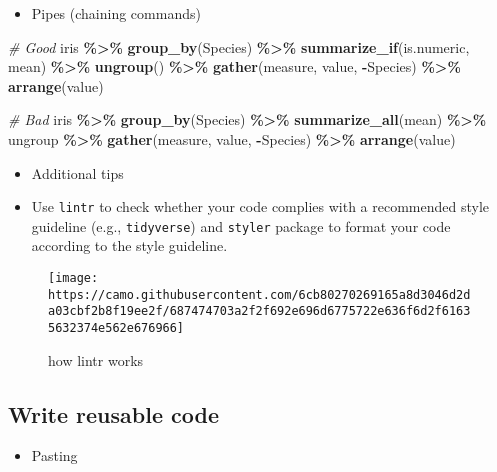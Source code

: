 \documentclass[
]{book}
\newenvironment{Shaded}{\begin{snugshade}}{\end{snugshade}}
\newcommand{\CommentTok}[1]{\textcolor[rgb]{0.56,0.35,0.01}{\textit{#1}}}
\newcommand{\KeywordTok}[1]{\textcolor[rgb]{0.13,0.29,0.53}{\textbf{#1}}}
\newcommand{\NormalTok}[1]{#1}
\newcommand{\OperatorTok}[1]{\textcolor[rgb]{0.81,0.36,0.00}{\textbf{#1}}}
\newcommand{\StringTok}[1]{\textcolor[rgb]{0.31,0.60,0.02}{#1}}
\providecommand{\tightlist}{%
  \setlength{\itemsep}{0pt}\setlength{\parskip}{0pt}}
\begin{document}
\begin{itemize}
\tightlist
\item
  Pipes (chaining commands)
\end{itemize}

\begin{Shaded}
\begin{Highlighting}[]
\CommentTok{\# Good}
\NormalTok{iris }\OperatorTok{\%>\%}
\StringTok{  }\KeywordTok{group\_by}\NormalTok{(Species) }\OperatorTok{\%>\%}
\StringTok{  }\KeywordTok{summarize\_if}\NormalTok{(is.numeric, mean) }\OperatorTok{\%>\%}
\StringTok{  }\KeywordTok{ungroup}\NormalTok{() }\OperatorTok{\%>\%}
\StringTok{  }\KeywordTok{gather}\NormalTok{(measure, value, }\OperatorTok{{-}}\NormalTok{Species) }\OperatorTok{\%>\%}
\StringTok{  }\KeywordTok{arrange}\NormalTok{(value)}

\CommentTok{\# Bad}
\NormalTok{iris }\OperatorTok{\%>\%}\StringTok{ }\KeywordTok{group\_by}\NormalTok{(Species) }\OperatorTok{\%>\%}\StringTok{ }\KeywordTok{summarize\_all}\NormalTok{(mean) }\OperatorTok{\%>\%}
\NormalTok{ungroup }\OperatorTok{\%>\%}\StringTok{ }\KeywordTok{gather}\NormalTok{(measure, value, }\OperatorTok{{-}}\NormalTok{Species) }\OperatorTok{\%>\%}
\KeywordTok{arrange}\NormalTok{(value)}
\end{Highlighting}
\end{Shaded}

\begin{itemize}
\item
  Additional tips
\item
  Use \texttt{lintr} to check whether your code complies with a recommended style guideline (e.g., \texttt{tidyverse}) and \texttt{styler} package to format your code according to the style guideline.
\end{itemize}

\begin{figure}
\centering
\texttt{[image: https://camo.githubusercontent.com/6cb80270269165a8d3046d2da03cbf2b8f19ee2f/687474703a2f2f692e696d6775722e636f6d2f61635632374e562e676966]}
\caption{how lintr works}
\end{figure}

\hypertarget{write-reusable-code}{%
\subsection{Write reusable code}\label{write-reusable-code}}

\begin{itemize}
\tightlist
\item
  Pasting
\end{itemize}
\end{document}
